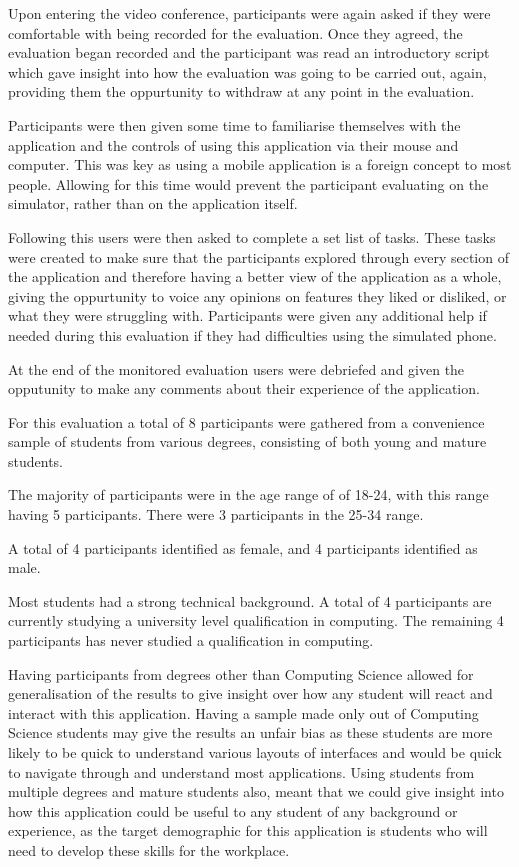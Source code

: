 \documentclass{l4proj}
\begin{document}
\par 
Upon entering the video conference, participants were again asked if they were comfortable with being recorded for the evaluation. 
Once they agreed, the evaluation began recorded and the participant was read an introductory script which gave insight into how
the evaluation was going to be carried out, again, providing them the oppurtunity to withdraw at any point in the evaluation.
\par 
Participants were then given some time to familiarise themselves with the application and the controls of using this application
via their mouse and computer. This was key as using a mobile application is a foreign concept to most people. Allowing for 
this time would prevent the participant evaluating on the simulator, rather than on the application itself. 
\par 
Following this users were then asked to complete a set list of tasks. These tasks were created to make sure that the participants 
explored through every section of the application and therefore having a better view of the application as a whole, giving the oppurtunity
to voice any opinions on features they liked or disliked, or what they were struggling with. Participants were given any additional help 
if needed during this evaluation if they had difficulties using the simulated phone.
\par 
At the end of the monitored evaluation users were debriefed and given the opputunity to make any comments about their experience
of the application.
\par 
\par 
For this evaluation a total of 8 participants were gathered from a convenience sample of students from various degrees, 
consisting of both young and mature students. 
\par 
The majority of participants were in the age range of of 18-24, with this range having 5 participants. There were 
3 participants in the 25-34 range.
\par 
A total of 4 participants identified as female, and 4 participants identified as male.
\par 
Most students had a strong technical background. A total of 4 participants are currently studying a university level 
qualification in computing. The remaining 4 participants has never studied a qualification in computing.
\par 
Having participants from degrees other than Computing Science allowed for generalisation of the results to give insight
over how any student will react and interact with this application. Having a sample made only out of Computing Science
students may give the results an unfair bias as these students are more likely to be quick to understand 
various layouts of interfaces and would be quick to navigate through and understand most applications. Using students from 
multiple degrees and mature students also, meant that we could give insight into how this application could be useful to
any student of any background or experience, as the target demographic for this application is students who will need to develop these
skills for the workplace.
\end{document}
